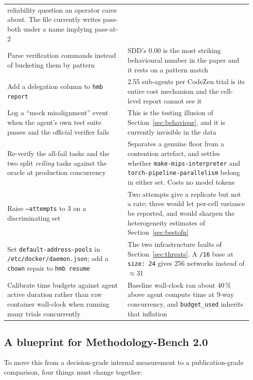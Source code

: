 \documentclass[11pt,a4paper]{article}
\newcommand{\code}[1]{\texttt{\small #1}}
\newcommand{\task}[1]{\texttt{\footnotesize #1}}
\begin{document}
\begin{table}[htbp]
\begin{tabular}{@{}p{6.6cm}p{9.2cm}@{}}
reliability question an operator cares about. The file currently writes pass-both under a name
implying pass-at-2 \\
\addlinespace
Parse verification commands instead of bucketing them by pattern &
SDD's 0.00 is the most striking behavioural number in the paper and it rests on a pattern
match \\
\addlinespace
Add a delegation column to \code{hmb report} &
2.55 sub-agents per CodeZen trial is its entire cost mechanism and the cell-level report
cannot see it \\
\addlinespace
Log a ``mock misalignment'' event when the agent's own test suite passes and the official
verifier fails &
This is the testing illusion of Section~\ref{sec:behaviour}, and it is currently invisible in
the data \\
\addlinespace
Re-verify the all-fail tasks and the two split \emph{ceiling} tasks against the oracle at
production concurrency &
Separates a genuine floor from a contention artefact, and settles whether
\task{make-mips-interpreter} and \task{torch-pipeline-parallelism} belong in either set.
Costs no model tokens \\
\addlinespace
Raise \code{--attempts} to 3 on a discriminating set &
Two attempts give a replicate but not a rate; three would let per-cell variance be reported,
and would sharpen the heterogeneity estimates of Section~\ref{sec:bestofn} \\
\addlinespace
Set \code{default-address-pools} in \code{/etc/docker/daemon.json}; add a \code{chown} repair
to \code{hmb resume} &
The two infrastructure faults of Section~\ref{sec:threats}. A \code{/16} base at
\code{size: 24} gives 256 networks instead of $\approx$31 \\
\addlinespace
Calibrate time budgets against agent active duration rather than raw container wall-clock when
running many trials concurrently &
Baseline wall-clock ran about 40\,\% above agent compute time at 9-way concurrency, and
\code{budget\_used} inherits that inflation \\
\bottomrule
\end{tabular}
\end{table}

\subsection{A blueprint for Methodology-Bench 2.0}

To move this from a decision-grade internal measurement to a publication-grade comparison,
four things must change together:
\end{document}
